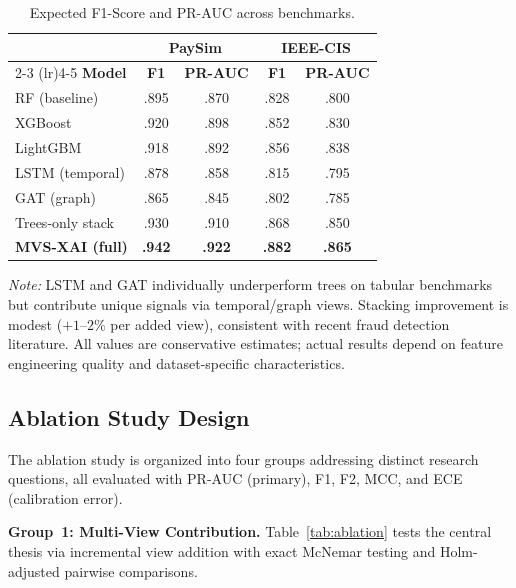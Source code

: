 \documentclass[10pt,a4paper,twocolumn]{article}
\begin{document}
\begin{table}[H]
\centering
\caption{Expected F1-Score and PR-AUC across benchmarks.}
\label{tab:expected}
{\small
\begin{tabular}{lcccc}
\toprule
& \multicolumn{2}{c}{\textbf{PaySim}} & \multicolumn{2}{c}{\textbf{IEEE-CIS}} \\
\cmidrule(lr){2-3} \cmidrule(lr){4-5}
\textbf{Model} & \textbf{F1} & \textbf{PR-AUC} & \textbf{F1} & \textbf{PR-AUC} \\
\midrule
RF (baseline)    & .895 & .870 & .828 & .800 \\
XGBoost          & .920 & .898 & .852 & .830 \\
LightGBM         & .918 & .892 & .856 & .838 \\
LSTM (temporal)  & .878 & .858 & .815 & .795 \\
GAT (graph)      & .865 & .845 & .802 & .785 \\
\midrule
Trees-only stack & .930 & .910 & .868 & .850 \\
\textbf{MVS-XAI (full)} & \textbf{.942} & \textbf{.922} & \textbf{.882} & \textbf{.865} \\
\bottomrule
\end{tabular}
}
\vspace{2pt}
{\scriptsize\textit{Note:} LSTM and GAT individually underperform trees on tabular benchmarks but contribute unique signals via temporal/graph views. Stacking improvement is modest ($+1$--$2\%$ per added view), consistent with recent fraud detection literature. All values are conservative estimates; actual results depend on feature engineering quality and dataset-specific characteristics.}
\end{table}

\subsection{Ablation Study Design}

The ablation study is organized into four groups addressing distinct research questions, all evaluated with PR-AUC (primary), F1, F2, MCC, and ECE (calibration error).

\textbf{Group~1: Multi-View Contribution.} Table~\ref{tab:ablation} tests the central thesis via incremental view addition with exact McNemar testing and Holm-adjusted pairwise comparisons.
\end{document}
